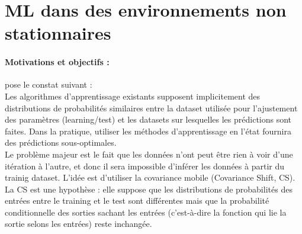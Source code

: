 \documentclass[a4paper,12pt]{report}
\newcommand\bk{\color{black}}
\newcommand\navy{\color{navy}}
\newcommand{\cad}{c'est-à-dire}
\numberwithin{equation}{section} %
\begin{document}
\newpage

\navy \chapter{ML dans des environnements non stationnaires} \bk
\subsubsection*{Motivations et objectifs :}
\noindent \cite{sugiyama2012machine} pose le constat suivant : \\
Les algorithmes d'apprentissage existants supposent implicitement des distributions  de probabilités similaires entre la dataset utilisée pour l'ajustement des paramètres (learning/test) et les datasets sur lesquelles les prédictions sont faites. Dans la pratique, utiliser les méthodes d'apprentissage en l'état fournira des prédictions sous-optimales.\\
Le problème majeur est le fait que les données n'ont peut être rien à voir d'une itération à l'autre, et donc il sera impossible d'inférer les données à partir du trainig dataset. L'idée est d'utiliser la covariance mobile (Covariance Shift, CS).\\

\noindent La CS est une hypothèse : elle suppose que les distributions de probabilités des entrées entre le training et le test sont différentes mais que la probabilité conditionnelle des sorties sachant les entrées (\cad $ $ la fonction qui lie la sortie selons les entrées) reste inchangée.

\newpage
\end{document}
